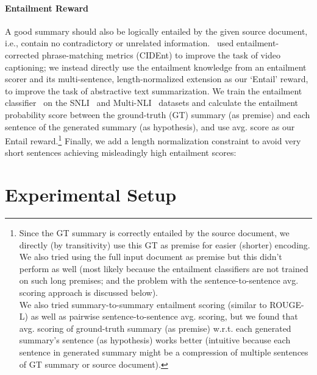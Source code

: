 \documentclass[11pt,a4paper]{article}
\begin{document}
\paragraph{Entailment Reward}
\label{subsec:entailment-rewards}
A good summary should also be logically entailed by the given source document, i.e., contain no contradictory or unrelated information.~ used entailment-corrected phrase-matching metrics  (CIDEnt) to improve the task of video captioning; we instead directly use the entailment knowledge from an entailment scorer and its multi-sentence, length-normalized extension as our `Entail' reward, to improve the task of abstractive text summarization. We train the entailment classifier~\cite{parikh2016decomposable} on the SNLI~\cite{bowman2015large} and Multi-NLI~\cite{williams2017broad} datasets and calculate the entailment probability score between the ground-truth (GT) summary (as premise) and each sentence of the generated summary (as hypothesis), and use  avg. score as our Entail reward.\footnote{Since the GT summary is correctly entailed by the source document, we directly (by transitivity) use this GT as premise for easier (shorter) encoding. We also tried using the full input document as premise but this didn't perform as well (most likely because the entailment classifiers are not trained on such long premises; and the problem with the sentence-to-sentence avg. scoring approach is discussed below).\\
We also tried summary-to-summary entailment scoring (similar to ROUGE-L) as well as pairwise sentence-to-sentence avg. scoring, but we found that avg. scoring of ground-truth summary (as premise) w.r.t. each generated summary's sentence (as hypothesis) works better (intuitive because each sentence in generated summary might be a compression of multiple sentences of GT summary or source document).} Finally, we add a length normalization constraint to avoid very short sentences achieving misleadingly high entailment scores: 
\vspace{-5pt}


















 

\section{Experimental Setup}
\label{sec-setup}
\end{document}
